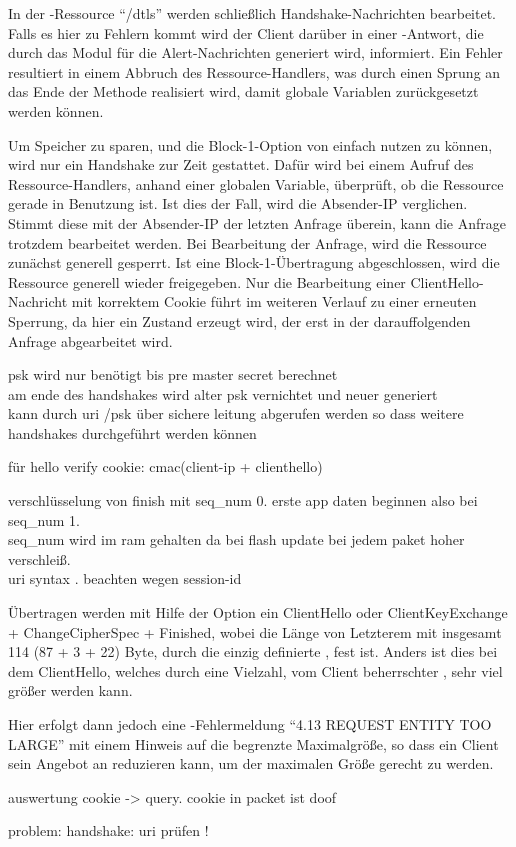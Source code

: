 In der -Ressource "`/dtls"' werden schließlich Handshake-Nachrichten bearbeitet. Falls es hier zu Fehlern kommt wird der Client darüber in einer
-Antwort, die durch das Modul für die Alert-Nachrichten generiert wird, informiert. Ein Fehler resultiert in einem Abbruch des Ressource-Handlers,
was durch einen Sprung an das Ende der Methode realisiert wird, damit globale Variablen zurückgesetzt werden können.

Um Speicher zu sparen, und die Block-1-Option von  einfach nutzen zu können, wird nur ein Handshake zur Zeit gestattet. Dafür wird bei einem Aufruf des
Ressource-Handlers, anhand einer globalen Variable, überprüft, ob die Ressource gerade in Benutzung ist. Ist dies der Fall, wird die Absender-IP verglichen.
Stimmt diese mit der Absender-IP der letzten Anfrage überein, kann die Anfrage trotzdem bearbeitet werden. Bei Bearbeitung der Anfrage, wird die Ressource
zunächst generell gesperrt. Ist eine Block-1-Übertragung abgeschlossen, wird die Ressource generell wieder freigegeben. Nur die Bearbeitung einer
ClientHello-Nachricht mit korrektem Cookie führt im weiteren Verlauf zu einer erneuten Sperrung, da hier ein Zustand erzeugt wird, der erst in der darauffolgenden
Anfrage abgearbeitet wird.   

psk wird nur benötigt bis pre master secret berechnet\\
am ende des handshakes wird alter psk vernichtet und neuer generiert\\
kann durch uri /psk über sichere leitung abgerufen werden so dass weitere handshakes durchgeführt werden können

für hello verify cookie: cmac(client-ip + clienthello)

verschlüsselung von finish mit seq\_num 0. erste app daten beginnen also bei seq\_num 1.\\
seq\_num wird im ram gehalten da bei flash update bei jedem paket hoher verschleiß.\\

uri syntax \cite{rfc3986}. beachten wegen session-id

Übertragen werden mit Hilfe der Option ein ClientHello oder ClientKeyExchange + ChangeCipherSpec + Finished, wobei die Länge von Letzterem mit
insgesamt 114 (87 + 3 + 22) Byte, durch die einzig definierte , fest ist. Anders ist dies bei dem ClientHello, welches durch
eine Vielzahl, vom Client beherrschter , sehr viel größer werden kann.

Hier erfolgt dann jedoch eine -Fehlermeldung "`4.13 REQUEST ENTITY TOO LARGE"' mit einem Hinweis auf die begrenzte Maximalgröße,
so dass ein Client sein Angebot an  reduzieren kann, um der maximalen Größe gerecht zu werden.

auswertung cookie -> query. cookie in packet ist doof

problem: handshake: uri prüfen !